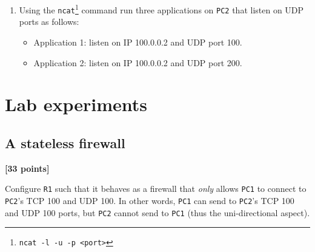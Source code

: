 \documentclass[pdftex,12pt,a4paper]{article}
\begin{document}
\begin{enumerate}
           \item Using the \texttt{ncat}\footnote{\texttt{ncat -l -u -p
               <port>}} command run three applications on \texttt{PC2} that
               listen on UDP ports as follows:
                \begin{itemize}
                    \item Application 1: listen on IP 100.0.0.2 and UDP port 100.
                    \item Application 2: listen on IP 100.0.0.2 and UDP port 200.
                \end{itemize}
        \end{enumerate}

    \section{Lab experiments}
        \subsection{A stateless firewall}
                \begin{flushright}
                    \textbf{[33 points]}
                \end{flushright}

                Configure \texttt{R1} such that it behaves as a firewall that
                \emph{only} allows \texttt{PC1} to connect to \texttt{PC2}'s TCP 100
                and UDP 100. In other words, \texttt{PC1} can send to
                \texttt{PC2}'s TCP 100 and UDP 100 ports, but \texttt{PC2}
                cannot send to \texttt{PC1} (thus the uni-directional aspect).
\end{document}
